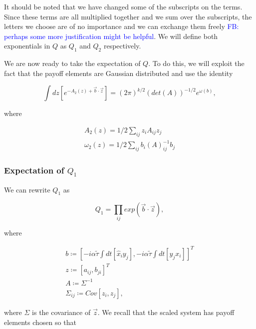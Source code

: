 \documentclass{article}
\newcommand\fb[1]{\textcolor{blue}{FB: #1}}
\begin{document}
	It should be noted that we have changed some of the subscripts on the terms. Since these terms
	are all multiplied together and we sum over the subscripts, the letters we choose are of no
	importance and we can exchange them freely \fb{perhaps some more justification might be helpful}. We will define both exponentials in $Q$ as $Q_1$ and
	$Q_2$ respectively.

	We are now ready to take the expectation of $Q$. To do this, we will exploit the fact that the
	payoff elements are Gaussian distributed and use the identity \cite{QFTbook}

	\begin{equation}
	\label{eqn::expectationIdentity}
		\int dz [e^{-A_2(z) + \Vec{b} \cdot \Vec{z}}] = (2 \pi)^{k/2} (det(A))^{-1/2} e^{\omega(b)},
	\end{equation}

	where

	\begin{equation*}
		\begin{split}
			A_2(z) = 1/2 \sum_{ij} z_i A_{ij} z_j \\
			\omega_2(z) = 1/2 \sum_{ij} b_i (A)^{-1}_{ij} b_j
		\end{split}
	\end{equation*}

	\subsubsection{Expectation of $Q_1$} %
	\label{ssub:expectation_of_Q1}
	
	We can rewrite $Q_1$ as 

	\begin{equation*}
		Q_1 = \prod_{ij} exp(\Vec{b} \cdot \Vec{z}),
	\end{equation*}

	where

	\begin{equation*}
		\begin{split}
			b \coloneqq [-i \alpha \tilde{\tau} \int dt[\hat{x}_i y_j], -i \alpha \tilde{\tau} \int
			dt[\hat{y}_j x_i]]^T \\
			z \coloneqq [a_{ij}, b_{ji}]^T\\
			A \coloneqq \Sigma^{-1}\\
			\Sigma_{ij} \coloneqq Cov[z_i, z_j],
		\end{split}
	\end{equation*}

	where $\Sigma$ is the covariance of $\Vec{z}$. We recall that the scaled system has
	payoff elements chosen so that
\end{document}

